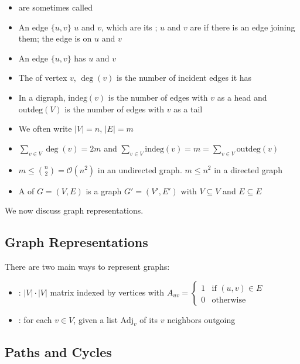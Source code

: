 \documentclass[12pt]{scrartcl}
\begin{document}
\begin{itemize}
    \item {} are sometimes called 
    \item An edge $\{u, v\}$  $u$ and $v$, which are its ; $u$ and $v$ are  if there is an edge joining them; the edge is  on $u$ and $v$
    \item An edge $\{u, v\}$ has  $u$ and  $v$
    \item The  of vertex $v$, $\deg (v)$ is the number of incident edges it has
    \item In a digraph, $\text{indeg}(v)$ is the number of edges with $v$ as a head and $\text{outdeg}(V)$ is the number of edges with $v$ as a tail
    \item We often write $|V| = n$, $|E| = m$
    \item $\sum_{v \in V} \deg (v) = 2m$ and $\sum_{v \in V} \text{indeg}(v) = m = \sum_{v \in V} \text{outdeg}(v)$
    \item $m \leq \binom{n}{2} = \mathcal{O}(n^2)$ in an undirected graph. $m \leq n^2$ in a directed graph
    \item A  of $G = (V, E)$ is a graph $G' = (V', E')$ with $V \subseteq V$ and $E \subseteq E$
\end{itemize}

We now discuss graph representations.

\subsection{Graph Representations}
There are two main ways to represent graphs:
    \begin{itemize}
        \item {}: $|V| \cdot |V|$ matrix indexed by vertices with $A_{uv} = \begin{cases}
            1 & \text{if } (u, v) \in E \\
            0 & \text{otherwise}
        \end{cases}$

        \item {}: for each $v \in V$, given a list $\text{Adj}_v$ of its $v$ neighbors outgoing
    \end{itemize}

\subsection{Paths and Cycles}
\end{document}

